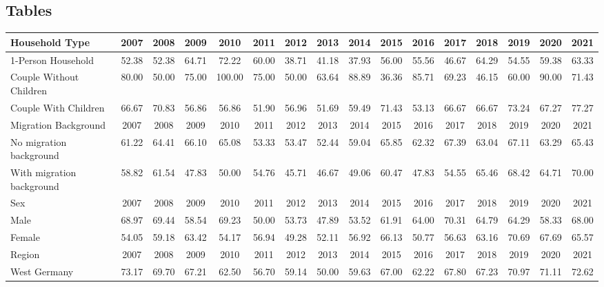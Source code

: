 
\begin{landscape}
\section{Tables}
\renewcommand{\thetable}{\thesection \arabic{table}}
\setcounter{table}{0}

\begin{table}[htbp]
\centering
\label{tab:nontakeup_hgtyp_migback_sex_east_siblings}
\begin{tabular}{lccccccccccccccc}
\toprule
Household Type & 2007 & 2008 & 2009 & 2010 & 2011 & 2012 & 2013 & 2014 & 2015 & 2016 & 2017 & 2018 & 2019 & 2020 & 2021 \\
\midrule
1-Person Household      & 52.38 & 52.38 & 64.71 & 72.22 & 60.00 & 38.71 & 41.18 & 37.93 & 56.00 & 55.56 & 46.67 & 64.29 & 54.55 & 59.38 & 63.33 \\
Couple Without Children & 80.00 & 50.00 & 75.00 & 100.00 & 75.00 & 50.00 & 63.64 & 88.89 & 36.36 & 85.71 & 69.23 & 46.15 & 60.00 & 90.00 & 71.43 \\
Couple With Children    & 66.67 & 70.83 & 56.86 & 56.86 & 51.90 & 56.96 & 51.69 & 59.49 & 71.43 & 53.13 & 66.67 & 66.67 & 73.24 & 67.27 & 77.27 \\
\midrule
Migration Background & 2007 & 2008 & 2009 & 2010 & 2011 & 2012 & 2013 & 2014 & 2015 & 2016 & 2017 & 2018 & 2019 & 2020 & 2021 \\
\midrule
No migration background   & 61.22 & 64.41 & 66.10 & 65.08 & 53.33 & 53.47 & 52.44 & 59.04 & 65.85 & 62.32 & 67.39 & 63.04 & 67.11 & 63.29 & 65.43 \\
With migration background & 58.82 & 61.54 & 47.83 & 50.00 & 54.76 & 45.71 & 46.67 & 49.06 & 60.47 & 47.83 & 54.55 & 65.46 & 68.42 & 64.71 & 70.00 \\
\midrule
Sex & 2007 & 2008 & 2009 & 2010 & 2011 & 2012 & 2013 & 2014 & 2015 & 2016 & 2017 & 2018 & 2019 & 2020 & 2021 \\
\midrule
Male   & 68.97 & 69.44 & 58.54 & 69.23 & 50.00 & 53.73 & 47.89 & 53.52 & 61.91 & 64.00 & 70.31 & 64.79 & 64.29 & 58.33 & 68.00 \\
Female & 54.05 & 59.18 & 63.42 & 54.17 & 56.94 & 49.28 & 52.11 & 56.92 & 66.13 & 50.77 & 56.63 & 63.16 & 70.69 & 67.69 & 65.57 \\
\midrule
Region & 2007 & 2008 & 2009 & 2010 & 2011 & 2012 & 2013 & 2014 & 2015 & 2016 & 2017 & 2018 & 2019 & 2020 & 2021 \\
\midrule
West Germany & 73.17 & 69.70 & 67.21 & 62.50 & 56.70 & 59.14 & 50.00 & 59.63 & 67.00 & 62.22 & 67.80 & 67.23 & 70.97 & 71.11 & 72.62 \\

\end{tabular}
\end{table}
\end{landscape}
